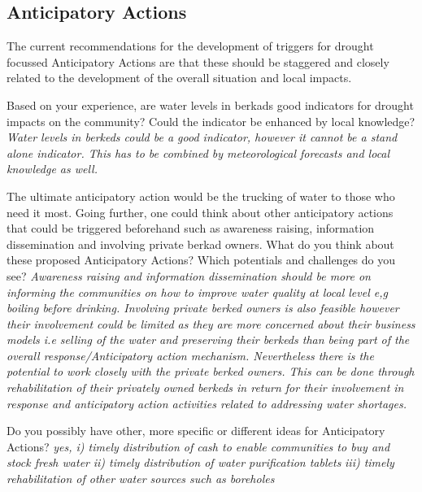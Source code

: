 \subsection*{Anticipatory Actions}
The current recommendations for the development of triggers for drought focussed Anticipatory Actions are that these should be staggered and closely related to the development of the overall situation and local impacts.

Based on your experience, are water levels in berkads good indicators for drought impacts on the community? Could the indicator be enhanced by local knowledge?\newline
\textit{Water levels in berkeds could be a good indicator, however it cannot be a stand alone indicator. This has to be combined by meteorological forecasts and local knowledge as well.}

The ultimate anticipatory action would be the trucking of water to those who need it most. Going further, one could think about other anticipatory actions that could be triggered beforehand such as awareness raising, information dissemination and involving private berkad owners. What do you think about these proposed Anticipatory Actions? Which potentials and challenges do you see? \newline
\textit{Awareness raising and information dissemination should be more on informing the communities on how to improve water quality at local level e,g boiling before drinking. Involving private berked owners is also feasible however their involvement could be limited as they are more concerned about their business models i.e selling of the water and preserving their berkeds than being part of the overall response/Anticipatory action mechanism. Nevertheless there is the potential to work closely with the private berked owners. This can be done through rehabilitation of their privately owned berkeds in return for their involvement in response and anticipatory action activities related to addressing water shortages.}

Do you possibly have other, more specific or different ideas for Anticipatory Actions? \newline
\textit{yes, i) timely distribution of cash to enable communities to buy and stock fresh water}\newline
\textit{ii) timely distribution of water purification tablets}\newline
\textit{iii) timely rehabilitation of other water sources such as boreholes}

